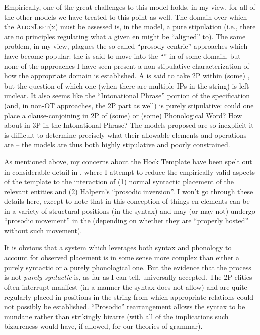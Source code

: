 \documentclass[output=paper,
modfonts
]{LSP/langsci}
\begin{document}
Empirically, one of the great challenges to this model holds, in my view, for all of the
other models we have treated to this point as well. The domain over which the \textsc{AlignLeft}(x) 
must be assessed is, in the model, a pure stipulation (i.e., there are no principles regulating what
a given en might be ``aligned'' to). 
The same problem, in my view, plagues the so-called ``prosody-centric'' approaches which have
become popular: the  is said to move into the ``'' in  of some domain,
but none of the approaches I have seen \citep{keydana2011,lowe2014,goldstein2016} present a non-stipulative characterization
of how the appropriate domain is established. A  is said to take 2P within (some) ,
but the question of which one (when there are multiple IPs in the string) is left unclear. It also seems like the ``Intonational Phrase'' portion of
the specification (and, in non-OT approaches, the 2P part as well) is purely stipulative: could one place a clause-conjoining
 in 2P of (some)  or (some) Phonological Word? How about in 3P in the Intonational
Phrase? The models proposed are so inexplicit it is difficult to determine precisely what their allowable
elements and operations are -- the models are thus both highly stipulative and poorly constrained.

As mentioned above, my concerns about the Hock Template have been spelt out in considerable detail in \citet{hale1996},
where I attempt to reduce the empirically valid aspects of the template to the interaction of (1) normal
syntactic placement of the relevant entities and (2) Halpern's \citeyearpar{halpern1995} ``prosodic inversion''. I won't go
through these details here, except to note that in this conception of things en elements can be in a variety of structural positions (in the syntax) and may
(or may not) undergo ``prosodic movement'' in the  (depending on whether they are ``properly hosted''
without such movement).

It is obvious that a system which leverages both syntax and phonology to account for
observed  placement is in some sense more complex than either a purely syntactic or a purely
phonological one.  But the evidence that the process is not \textit{purely syntactic} is, as far as I
can tell, universally accepted. The 2P clitics often interrupt manifest  (in
a manner the syntax does not allow) and are quite regularly placed in positions in the string from
which appropriate  relations could not possibly be established. ``Prosodic'' rearrangement
allows the syntax to be mundane rather than strikingly bizarre (with all of the implications 
such bizarreness would have, if allowed, for our theories of grammar).
\end{document}

